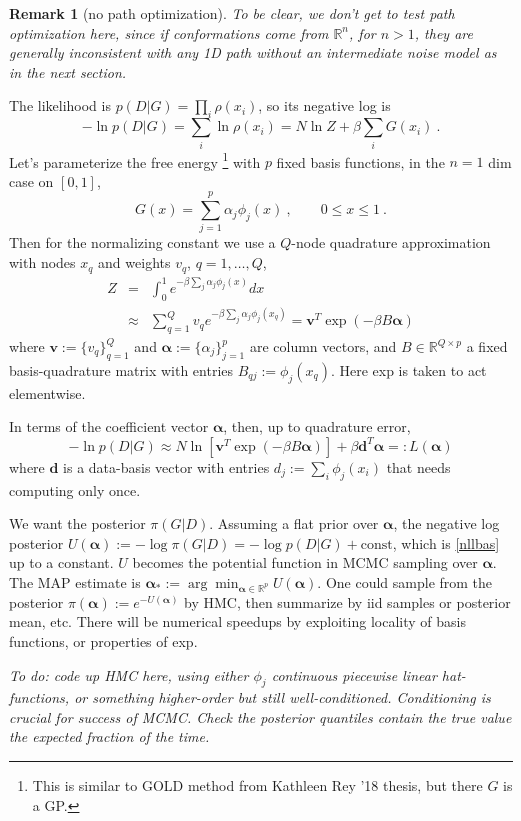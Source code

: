 \documentclass[10pt]{article}
\newcommand{\be}{\begin{equation}}
\newcommand{\ee}{\end{equation}}
\newcommand{\bea}{\begin{eqnarray}}
\newcommand{\eea}{\end{eqnarray}}
\newcommand{\mbf}[1]{{\mathbf #1}}
\newcommand{\R}{\mathbb{R}}
\newtheorem{rmk}[thm]{Remark}
\newcommand{\al}{\alpha}
\newcommand{\bt}{\beta}
\newcommand{\bal}{{\bm\alpha}}
\begin{document}
\begin{rmk}[no path optimization]
To be clear, we don't get to test path optimization here, since if conformations
come from $\R^n$, for $n>1$, they are generally inconsistent with any 1D path
without an intermediate noise model as in the next section.
\end{rmk}

The likelihood is $p(D|G) = \prod_i \rho(x_i)$, so its negative log is
\be
-\ln p(D|G) = \sum_i \ln \rho(x_i) = N \ln Z + \bt \sum_i G(x_i)~.
\label{nll}
\ee
Let's parameterize the free energy
\footnote{This is similar to GOLD method from Kathleen Rey '18 thesis, but
  there $G$ is a GP.}
with $p$ fixed basis functions,
in the $n=1$ dim case on $[0,1]$,
\be
G(x) = \sum_{j=1}^p \al_j \phi_j(x)~,\qquad  0\le x \le 1~.
\label{basis}
\ee
Then
for the normalizing constant
we use a $Q$-node quadrature approximation
with nodes $x_q$ and weights $v_q$, $q=1,\dots,Q$,
\bea
Z &= &\int_0^1 e^{-\bt \sum_j \al_j \phi_j(x)} dx
\label{Z1}
\\
&\approx&
\sum_{q=1}^Q v_q e^{-\bt \sum_j \al_j \phi_j(x_q)} = 
\mbf{v}^T \exp (-\bt B \bal)
\eea
where $\mbf{v} := \{v_q\}_{q=1}^Q$
and $\bal := \{\al_j\}_{j=1}^p$
are column vectors, and
$B \in \R^{Q\times p}$ a fixed basis-quadrature matrix with entries
$B_{qj}:= \phi_j(x_q)$. Here exp is taken to act elementwise.

In terms of the coefficient vector $\bal$, then, up to quadrature
error,
\be
- \ln p(D|G) \approx
N \ln [\mbf{v}^T \exp (-\bt B \bal)]
+ \bt \mbf{d}^T \bal
\label{nllbas}
=: L(\bal)
\ee
where $\mbf{d}$ is a data-basis vector with entries
$d_j := \sum_i \phi_j(x_i)$ that needs computing only once.

We want the posterior $\pi(G|D)$.
Assuming a flat prior over $\bal$, the negative log posterior
$U(\bal) := -\log \pi(G|D) = -\log p(D|G) + \mbox{const}$,
which is \eqref{nllbas} up to a constant.
$U$ becomes the potential function in MCMC sampling over $\bal$.
The MAP estimate is $\bal_*:=\arg\min_{\bal\in\R^p} U(\bal)$.
One could sample from the posterior $\pi(\bal):=e^{-U(\bal)}$ by HMC,
then summarize by iid samples or posterior mean, etc.
There will be numerical speedups by exploiting locality of
basis functions, or properties of exp.

{\em 
To do: code up HMC here, using either $\phi_j$ continuous piecewise
linear hat-functions, or something higher-order but still well-conditioned.
Conditioning is crucial for success of MCMC.
Check the posterior quantiles contain the true value the expected fraction
of the time.
}
\end{document}
